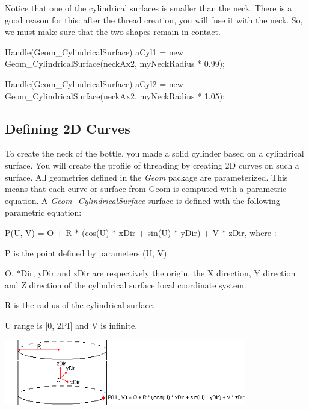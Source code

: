 Notice that one of the cylindrical surfaces is smaller than the neck. There is a good reason for this\+: after the thread creation, you will fuse it with the neck. So, we must make sure that the two shapes remain in contact.


\begin{DoxyCode}
Handle(Geom\_CylindricalSurface) aCyl1 = \textcolor{keyword}{new} Geom\_CylindricalSurface(neckAx2, myNeckRadius * 0.99);

Handle(Geom\_CylindricalSurface) aCyl2 = \textcolor{keyword}{new} Geom\_CylindricalSurface(neckAx2, myNeckRadius * 1.05);
\end{DoxyCode}
\hypertarget{occt__tutorial_OCCT_TUTORIAL_SUB4_2}{}\subsection{Defining 2\+D Curves}\label{occt__tutorial_OCCT_TUTORIAL_SUB4_2}
To create the neck of the bottle, you made a solid cylinder based on a cylindrical surface. You will create the profile of threading by creating 2D curves on such a surface. All geometries defined in the {\itshape Geom} package are parameterized. This means that each curve or surface from Geom is computed with a parametric equation. A {\itshape Geom\+\_\+\+Cylindrical\+Surface} surface is defined with the following parametric equation\+:

P(\+U, V) = O + R $\ast$ (cos(\+U) $\ast$ x\+Dir + sin(\+U) $\ast$ y\+Dir) + V $\ast$ z\+Dir, where \+:


\begin{DoxyItemize}
\item P is the point defined by parameters (U, V).
\item O, $\ast$\+Dir, y\+Dir and z\+Dir are respectively the origin, the X direction, Y direction and Z direction of the cylindrical surface local coordinate system.
\item R is the radius of the cylindrical surface.
\item U range is \mbox{[}0, 2\+PI\mbox{]} and V is infinite.
\end{DoxyItemize}


\begin{DoxyImageNoCaption}
\begin{center}
   \mbox{\includegraphics[width=400]{tutorial_image012.png}}
\end{center}
\end{DoxyImageNoCaption}


